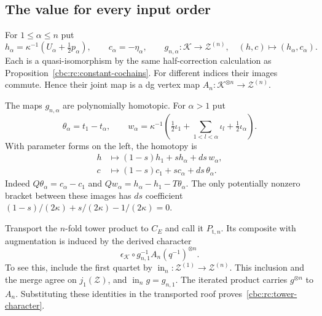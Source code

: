 \subsection{The value for every input order}

For $1\leq\alpha\leq n$ put
\[
 h_\alpha=\kappa^{-1}(U_\alpha+\tfrac12p_\alpha),
 \qquad c_\alpha=-\eta_\alpha,
 \qquad
 g_{n,\alpha}:\mathcal K\to\mathcal Z^{(n)},\quad
 (h,c)\longmapsto(h_\alpha,c_\alpha).
\]
Each is a quasi-isomorphism by the same half-correction
calculation as Proposition~\ref{cbc:rc:constant-cochains}.
For different indices their images commute. Hence their
joint map is a dg vertex map
$A_n:\mathcal K^{\otimes n}\to\mathcal Z^{(n)}$.

The maps $g_{n,\alpha}$ are polynomially homotopic. For
$\alpha>1$ put
\[
 \theta_\alpha=t_1-t_\alpha,\qquad
 w_\alpha=\kappa^{-1}
 (\tfrac12\iota_1+\sum_{1<l<\alpha}\iota_l+\tfrac12\iota_\alpha).
\]
With parameter forms on the left, the homotopy is
\begin{align*}
 h&\longmapsto(1-s)h_1+sh_\alpha+ds\,w_\alpha,\\
 c&\longmapsto(1-s)c_1+sc_\alpha+ds\,\theta_\alpha.
\end{align*}
Indeed $Q\theta_\alpha=c_\alpha-c_1$ and
$Qw_\alpha=h_\alpha-h_1-T\theta_\alpha$.
The only potentially nonzero bracket between these
images has $ds$ coefficient
$(1-s)/(2\kappa)+s/(2\kappa)-1/(2\kappa)=0$.

Transport the $n$-fold tower product to $C_E$ and call
it $P_{\mathrm t,n}$. Its composite with augmentation
is induced by the derived character
\begin{equation}\label{cbc:rc:tower-character}
 \epsilon_{\mathcal K}\circ g_{n,1}^{-1}A_n(q^{-1})^{\otimes n}.
\end{equation}
To see this, include the first quartet by
$\operatorname{in}_n:\mathcal Z^{(1)}\to\mathcal Z^{(n)}$.
This inclusion and the merge agree on $j_1(\mathcal Z)$,
and $\operatorname{in}_ng=g_{n,1}$.
The iterated product carries $g^{\otimes n}$ to $A_n$.
Substituting these identities in the transported roof
proves~\eqref{cbc:rc:tower-character}.

